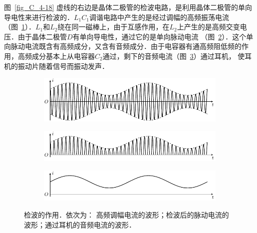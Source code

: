 图~\ref{fig_C_4-18} 虚线的右边是晶体二极管的检波电路，是利用晶体二极管的单向导电性来进行检波的．$L_1C_1$调谐电路中产生的是经过调幅的高频振荡电流（图~\ref{fig_C_4-19a}）．$L_1$和$L_2$绕在同一磁棒上，由于互感作用，在$L_2$上产生的是高频交变电压．由于晶体二极管$D$有单向导电性，通过它的是单向脉动电流
（图~\ref{fig_C_4-19b}）．这个单向脉动电流既含有高频成分，又含有音频成分．由于电容器有通高频阻低频的作用，高频成分基本上从电容器$C_2$通过，剩下的音频电流（图~\ref{fig_C_4-19c}）通过耳机，
使耳机的振动片随着信号而振动发声．
\begin{figure}[htbp]
    \centering
    \begin{subfigure}{0.8\linewidth}
        \centering
        \includegraphics{fig/C/4-19a.pdf}
        \caption{}\label{fig_C_4-19a}
    \end{subfigure}
    \hfil
    \begin{subfigure}{0.8\linewidth}
        \centering
        \includegraphics{fig/C/4-19b.pdf}
        \caption{}\label{fig_C_4-19b}
    \end{subfigure}
    \hfil
    \begin{subfigure}{0.8\linewidth}
        \centering
        \includegraphics{fig/C/4-19c.pdf}
        \caption{}\label{fig_C_4-19c}
    \end{subfigure}
    \caption{检波的作用．依次为：
        高频调幅电流的波形；检波后的脉动电流的波形；通过耳机的音频电流的波形．}\label{fig_C_4-19}
\end{figure}

